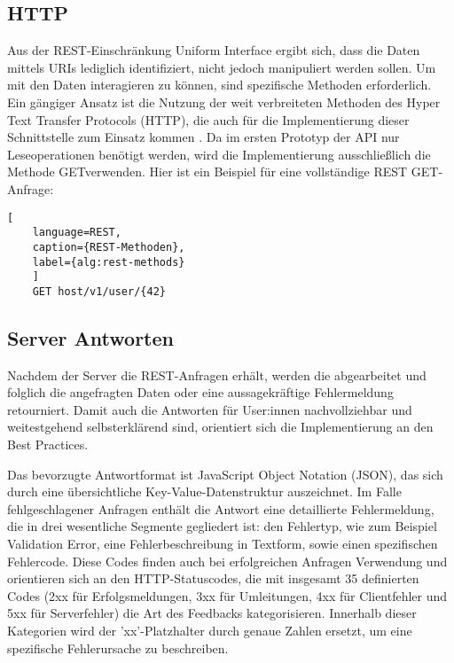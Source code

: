 \documentclass[draft,final]{vutinfth} %
\begin{document}
\subsection{HTTP}

Aus der REST-Einschränkung Uniform Interface ergibt sich, dass die Daten mittels URIs lediglich identifiziert, nicht jedoch manipuliert werden sollen. 
Um mit den Daten interagieren zu können, sind spezifische Methoden erforderlich. 
Ein gängiger Ansatz ist die Nutzung der weit verbreiteten Methoden des Hyper Text Transfer Protocols (HTTP), die auch für die Implementierung dieser Schnittstelle zum Einsatz kommen  \cite{Murphy:2017:RestStyleGuide}. 
Da im ersten Prototyp der API nur Leseoperationen benötigt werden, wird die Implementierung ausschließlich die Methode \grqq GET\grqq verwenden. 
Hier ist ein Beispiel für eine vollständige REST GET-Anfrage:

\begin{lstlisting}[
	language=REST, 
	caption={REST-Methoden}, 
	label={alg:rest-methods}
	]
	GET host/v1/user/{42}
\end{lstlisting}


\subsection{Server Antworten}

Nachdem der Server die REST-Anfragen erhält, werden die abgearbeitet und folglich die angefragten Daten oder eine aussagekräftige Fehlermeldung retourniert.
Damit auch die Antworten für User:innen nachvollziehbar und weitestgehend selbsterklärend sind, orientiert sich die Implementierung an den Best Practices.

Das bevorzugte Antwortformat ist JavaScript Object Notation (JSON), das sich durch eine übersichtliche Key-Value-Datenstruktur auszeichnet. 
Im Falle fehlgeschlagener Anfragen enthält die Antwort eine detaillierte Fehlermeldung, die in drei wesentliche Segmente gegliedert ist: 
den Fehlertyp, wie zum Beispiel Validation Error, eine  Fehlerbeschreibung in Textform, sowie einen spezifischen Fehlercode. 
Diese Codes finden auch bei erfolgreichen Anfragen Verwendung und orientieren sich an den HTTP-Statuscodes, die mit insgesamt 35 definierten Codes (2xx für Erfolgsmeldungen, 3xx für Umleitungen, 4xx für Clientfehler und 5xx für Serverfehler) die Art des Feedbacks kategorisieren. Innerhalb dieser Kategorien wird der 'xx'-Platzhalter durch genaue Zahlen ersetzt, um eine spezifische Fehlerursache zu beschreiben. \cite{Murphy:2017:RestStyleGuide}
\end{document}
